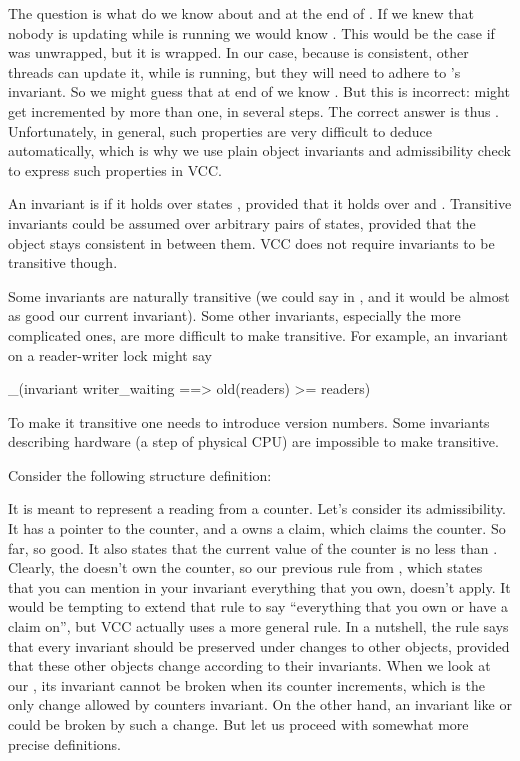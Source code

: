 \noindent
The question is what do we know about  and 
at the end of .
If we knew that nobody is updating  while 
is running we would know .
This would be the case if  was unwrapped, but it is wrapped.
In our case, because  is consistent, other threads can update it,
while  is running, but they will need to
adhere to 's invariant.
So we might guess that at end of  we know
.
But this is incorrect:  might get incremented
by more than one, in several steps.
The correct answer is thus .
Unfortunately, in general, such properties are very difficult to deduce
automatically, which is why we use plain object invariants and admissibility
check to express such properties in VCC.

\begin{note}
An invariant is  if it holds over states ,
provided that it holds over  and .
Transitive invariants could be assumed over arbitrary
pairs of states, provided that the object stays consistent
in between them. 
VCC does not require invariants to be transitive though.

Some invariants are naturally transitive (\eg we could say
 in ,
and it would be almost as good our current invariant).
Some other invariants, especially the more complicated ones,
are more difficult to make transitive.
For example, an invariant on a reader-writer lock might say
\begin{VCC}
_(invariant writer_waiting ==> old(readers) >= readers)
\end{VCC}
\noindent
To make it transitive one needs to introduce version numbers.
Some invariants describing hardware (\eg a step of physical CPU)
are impossible to make transitive.
\end{note}

Consider the following structure definition:


\noindent 
It is meant to represent a reading from a counter.
Let's consider its admissibility.
It has a pointer to the counter, and a owns a claim, which
claims the counter.
So far, so good.
It also states that the current value of the counter is no less than .
Clearly, the  doesn't own the counter, so our previous rule
from , which states
that you can mention in your invariant everything that you own, doesn't apply.
It would be tempting to extend that rule to say ``everything that you own
or have a claim on'', but VCC actually uses a more general rule.
In a nutshell, the rule says that every invariant should be preserved
under changes to other objects, provided that these other objects change
according to their invariants.
When we look at our , its invariant cannot be broken when
its counter increments, which is the only change allowed by counters invariant.
On the other hand, an invariant like  or 
could be broken by such a change.
But let us proceed with somewhat more precise definitions.


